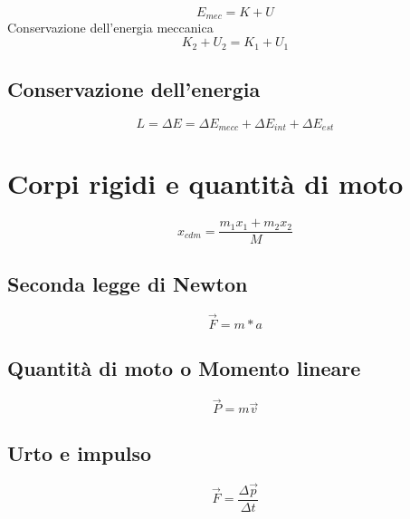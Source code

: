 \documentclass{article}
\begin{document}
\begin{equation}
  \label{eq:emec}
  E_{mec}=K+U
\end{equation}
Conservazione dell'energia meccanica
\begin{equation}
  \label{eq:consenmec}
  K_2+U_2=K_1+U_1
\end{equation}

\subsection{Conservazione dell'energia}
\label{sec:consen}

\begin{equation}
  \label{eq:entot}
  L=\Delta{}E= \Delta{} E_{mecc} + \Delta{} E_{int} + \Delta{} E_{est}
\end{equation}

\section{Corpi rigidi e quantità di moto}
\label{sec:centrigequadimot}

\begin{equation}
  \label{eq:cdm}
  x_{cdm}=\frac{m_1 x_1+m_2x_2}{M}
\end{equation}

\subsection{Seconda legge di Newton}
\label{sec:seclegdiNew}
\begin{equation}
  \label{eq:seclegNew}
  \vec{F}=m*a
\end{equation}

\subsection{Quantità di moto o Momento lineare}
\label{sec:mv}

\begin{equation}
  \vec{P}=m\vec{v}
\end{equation}

\subsection{Urto e impulso}
\label{sec:urim}

\begin{equation}
  \label{eq:urtoeimp}
  \vec{F}=\frac{\Delta{}\vec{p}}{\Delta{}t}
\end{equation}
\end{document}
